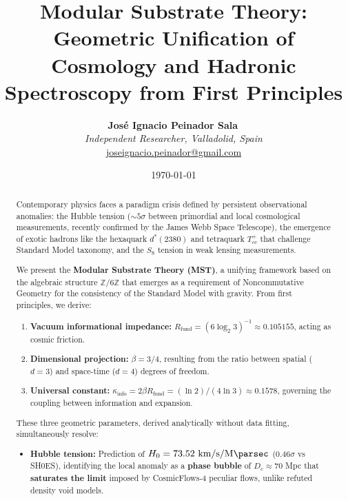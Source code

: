 \documentclass[11pt, a4paper]{article}
\title{\textbf{Modular Substrate Theory: \\ Geometric Unification of Cosmology and Hadronic Spectroscopy from First Principles}}
\author{
  \textbf{José Ignacio Peinador Sala}\,\orcidlink{0009-0008-1822-3452} \\
  \textit{Independent Researcher, Valladolid, Spain} \\
  \small\href{mailto:joseignacio.peinador@gmail.com}{joseignacio.peinador@gmail.com}
}
\date{\today}
\theoremstyle{plain}
\theoremstyle{definition}
\newcommand{\Rfactor}{R_{\text{fund}}}
\newcommand{\Kinfo}{\kappa_{\text{info}}}
\begin{document}
\maketitle


\begin{abstract}
\noindent
Contemporary physics faces a paradigm crisis defined by persistent observational anomalies: the Hubble tension ($\sim 5\sigma$ between primordial and local cosmological measurements, recently confirmed by the James Webb Space Telescope), the emergence of exotic hadrons like the hexaquark $d^*(2380)$ and tetraquark $T_{cc}^+$ that challenge Standard Model taxonomy, and the $S_8$ tension in weak lensing measurements.

We present the \textbf{Modular Substrate Theory (MST)}, a unifying framework based on the algebraic structure $\mathbb{Z}/6\mathbb{Z}$ that emerges as a requirement of Noncommutative Geometry for the consistency of the Standard Model with gravity. From first principles, we derive:

\begin{enumerate}
    \item \textbf{Vacuum informational impedance:} $\Rfactor = (6\log_2 3)^{-1} \approx 0.105155$, acting as cosmic friction.
    
    \item \textbf{Dimensional projection:} $\beta = 3/4$, resulting from the ratio between spatial ($d=3$) and space-time ($d=4$) degrees of freedom.
    
    \item \textbf{Universal constant:} $\Kinfo = 2\beta\Rfactor = (\ln 2)/(4\ln 3) \approx 0.1578$, governing the coupling between information and expansion.
\end{enumerate}

These three geometric parameters, derived analytically without data fitting, simultaneously resolve:

\begin{itemize}
    \item \textbf{Hubble tension:} Prediction of $H_0 = 73.52\ \si{\kilo\meter\per\second\per\mega\parsec}$ ($0.46\sigma$ vs SH0ES), identifying the local anomaly as a \textbf{phase bubble} of $D_c \approx 70$ Mpc that \textbf{saturates the limit} imposed by CosmicFlows-4 peculiar flows, unlike refuted density void models.
    

\end{itemize}
\end{abstract}
\end{document}
